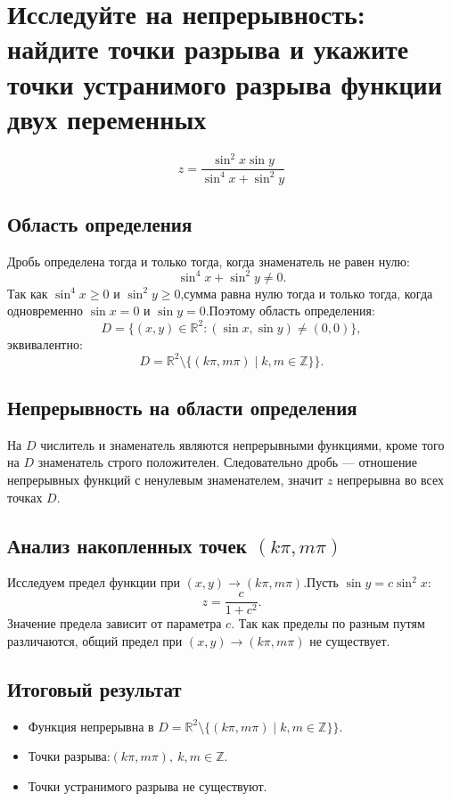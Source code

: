 \section{Исследуйте на непрерывность: найдите точки разрыва и укажите
точки устранимого разрыва функции двух переменных}
\[
z = \frac{\sin^2{x}\sin{y}}{\sin^4{x} + \sin^2{y}}
\]

\subsection{Область определения}

Дробь определена тогда и только тогда, когда знаменатель не равен нулю:
\[
\sin^4{x} + \sin^2{y} \neq 0.
\]
Так как \(\sin^4{x} \ge 0\) и \(\sin^2{y} \ge 0\),сумма равна нулю тогда и только тогда, когда одновременно \(\sin{x} = 0\) и \(\sin{y} = 0\).Поэтому область определения:
\[
D = \{ (x,y) \in \mathbb{R}^2:(\sin{x},\sin{y}) \neq (0,0) \},
\]
эквивалентно:
\[
D = \mathbb{R}^2 \setminus \{(k\pi, m\pi) \mid k,m \in \mathbb{Z}\}\}.
\]

\subsection{Непрерывность на области определения}

На \( D \) числитель и знаменатель являются непрерывными функциями, кроме того на \( D \) знаменатель строго положителен. Следовательно дробь --- отношение непрерывных функций с ненулевым знаменателем, значит \( z \) непрерывна во всех точках \( D \).

\subsection{Анализ накопленных точек \((k\pi, m\pi)\)}

Исследуем предел функции при \((x, y) \xrightarrow{} (k\pi, m\pi)\).Пусть \(\sin{y} = c\sin^2{x}\):
\[
z = \frac{c}{1 + c^2}.
\]
Значение предела зависит от параметра \(c\).
Так как пределы по разным путям различаются, общий предел при \((x, y) \xrightarrow{} (k\pi, m\pi)\) не существует.

\subsection{Итоговый результат}

\begin{itemize}
    \item Функция непрерывна в \(D = \mathbb{R}^2 \setminus \{(k\pi, m\pi) \mid k,m \in \mathbb{Z}\}\}\).
    \item Точки разрыва:\((k\pi, m\pi) ,\ k,m \in \mathbb{Z}\).
    \item Точки устранимого разрыва не существуют.
\end{itemize}
